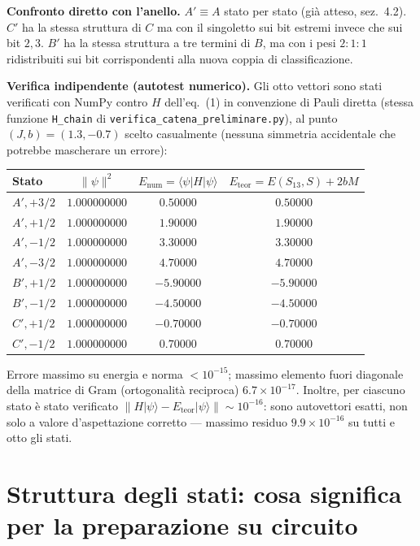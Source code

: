 \documentclass[11pt,a4paper]{article}
\begin{document}
\textbf{Confronto diretto con l'anello.} $A'\equiv A$ stato per stato (già
atteso, sez.~4.2). $C'$ ha la stessa struttura di $C$ ma con il singoletto
sui bit estremi invece che sui bit $2,3$. $B'$ ha la stessa struttura a tre
termini di $B$, ma con i pesi $2{:}1{:}1$ ridistribuiti sui bit
corrispondenti alla nuova coppia di classificazione.

\textbf{Verifica indipendente (autotest numerico).} Gli otto vettori sono
stati verificati con NumPy contro $H$ dell'eq.~(1) in convenzione di Pauli
diretta (stessa funzione \texttt{H\_chain} di \texttt{verifica\_catena\_preliminare.py}),
al punto $(J,b)=(1.3,-0.7)$ scelto casualmente (nessuna simmetria
accidentale che potrebbe mascherare un errore):

\begin{table}[h]
\centering
\begin{tabular}{@{}lccc@{}}
\toprule
Stato & $\|\psi\|^2$ & $E_{\text{num}}=\langle\psi|H|\psi\rangle$ & $E_{\text{teor}}=E(S_{13},S)+2bM$\\
\midrule
$A',{+}3/2$ & $1.000000000$ & $0.50000$ & $0.50000$\\
$A',{+}1/2$ & $1.000000000$ & $1.90000$ & $1.90000$\\
$A',{-}1/2$ & $1.000000000$ & $3.30000$ & $3.30000$\\
$A',{-}3/2$ & $1.000000000$ & $4.70000$ & $4.70000$\\
$B',{+}1/2$ & $1.000000000$ & $-5.90000$ & $-5.90000$\\
$B',{-}1/2$ & $1.000000000$ & $-4.50000$ & $-4.50000$\\
$C',{+}1/2$ & $1.000000000$ & $-0.70000$ & $-0.70000$\\
$C',{-}1/2$ & $1.000000000$ & $0.70000$ & $0.70000$\\
\bottomrule
\end{tabular}
\end{table}

Errore massimo su energia e norma $<10^{-15}$; massimo elemento fuori
diagonale della matrice di Gram (ortogonalità reciproca) $6.7\times10^{-17}$.
Inoltre, per ciascuno stato è stato verificato $\|H|\psi\rangle-E_{\text{teor}}|\psi\rangle\|\sim10^{-16}$:
sono autovettori esatti, non solo a valore d'aspettazione corretto —
massimo residuo $9.9\times10^{-16}$ su tutti e otto gli stati.

\section{Struttura degli stati: cosa significa per la preparazione su circuito}
\end{document}

